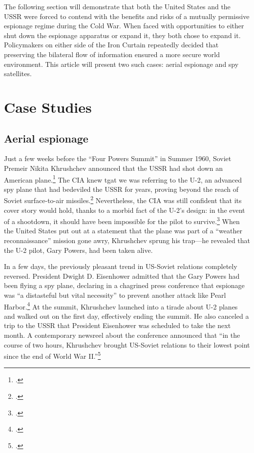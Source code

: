 \documentclass[14pt]{extarticle}
\begin{document}
The following section will demonstrate that both the United States and the USSR were forced to contend with the benefits and risks of a mutually permissive espionage regime during the Cold War. When faced with opportunities to either shut down the espionage apparatus or expand it, they both chose to expand it. Policymakers on either side of the Iron Curtain repeatedly decided that preserving the bilateral flow of information ensured a more secure world environment. This article will present two such cases: aerial espionage and spy satellites.

\section{Case Studies}

\subsection{Aerial espionage}
Just a few weeks before the \enquote{Four Powers Summit} in Summer 1960, Soviet Premeir Nikita Khrushchev announced that the USSR had shot down an American plane.\footcite[p.~112]{powers_operation_2004} The CIA knew tgat we was referring to the U-2, an advanced spy plane that had bedeviled the USSR for years, proving beyond the reach of Soviet surface-to-air missiles.\footcite{orlov_u-2_2007} Nevertheless, the CIA was still confident that its cover story would hold, thanks to a morbid fact of the U-2's design: in the event of a shootdown, it should have been impossible for the pilot to survive.\footcite[p.~35]{lindgren_trust_2000} When the United States put out at a statement that the plane was part of a \enquote{weather reconnaissance} mission gone awry, Khrushchev sprung his trap---he revealed that the U-2 pilot, Gary Powers, had been taken alive.

In a few days, the previously pleasant trend in US-Soviet relations completely reversed. President Dwight D. Eisenhower admitted that the Gary Powers had been flying a spy plane, declaring in a chagrined press conference that espionage was ``a distasteful but vital necessity'' to prevent another attack like Pearl Harbor.\footcite{eisenhower_news_1960} At the summit, Khrushchev launched into a tirade about U-2 planes and walked out on the first day, effectively ending the summit. He also canceled a trip to the USSR that President Eisenhower was scheduled to take the next month. A contemporary newsreel about the conference announced that \enquote{in the course of two hours, Khrushchev brought US-Soviet relations to their lowest point since the end of World War II.}\footcite{universal_studios_summit_1960}
\end{document}
